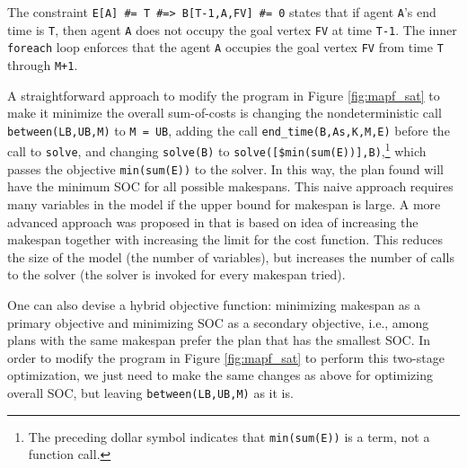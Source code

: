 \documentclass[conference]{IEEEtran}
\begin{document}
The constraint \verb+E[A] #= T #=> B[T-1,A,FV] #= 0+ states that if agent \texttt{A}'s end time is \texttt{T}, then agent \texttt{A} does not occupy the goal vertex \texttt{FV} at time \texttt{T-1}. The inner \texttt{foreach} loop enforces that the agent \texttt{A} occupies the goal vertex \texttt{FV} from time \texttt{T} through \texttt{M+1}.


A straightforward approach to modify the program in Figure \ref{fig:mapf_sat} to make it minimize the overall sum-of-costs is changing the nondeterministic call \texttt{between(LB,UB,M)} to \texttt{M = UB}, adding the call \texttt{end\_time(B,As,K,M,E)} before the call to \texttt{solve}, and changing \texttt{solve(B)} to \texttt{solve([\$min(sum(E))],B)},\footnote{The preceding dollar symbol indicates that \texttt{min(sum(E))} is a term, not a function call.} which passes the objective \texttt{min(sum(E))} to the solver. In this way, the plan found will have the minimum SOC for all possible makespans. This naive approach requires many variables in the model if the upper bound for makespan is large. A more advanced  approach was proposed in \cite{SurynekFSB16} that is based on idea of increasing the makespan together with increasing the limit for the cost function. This reduces the size of the model (the number of variables), but increases the number of calls to the solver (the solver is invoked for every makespan tried).


One can also devise a hybrid objective function: minimizing makespan as a primary objective and minimizing SOC as a secondary objective, i.e., among plans with the same makespan prefer the plan that has the smallest SOC. In order to modify the program in Figure \ref{fig:mapf_sat} to perform this two-stage optimization, we just need to make the same changes as above for optimizing overall SOC, but leaving \texttt{between(LB,UB,M)} as it is.
\end{document}
